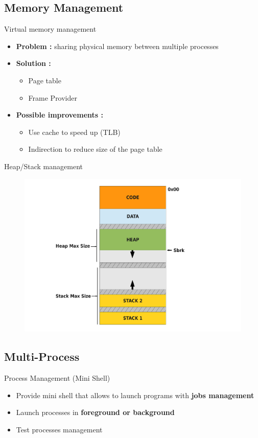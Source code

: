 \documentclass{beamer}
\begin{document}
\subsection{Memory Management}
\begin{frame}{Virtual memory management}
    \begin{itemize}
        \item \textbf{Problem :} sharing physical memory between multiple
            processes
        \item \textbf{Solution :}
            \begin{itemize}
                \item Page table
                \item Frame Provider
            \end{itemize}
        \item \textbf{Possible improvements :}
            \begin{itemize}
                \item Use cache to speed up (TLB)
                \item Indirection to reduce size of the page table
            \end{itemize}
    \end{itemize}
\end{frame}

\begin{frame}{Heap/Stack management}
    \begin{figure}[ht]
        \includegraphics[width=0.85\linewidth]{memoryschema.pdf}
    \end{figure}
\end{frame}

\subsection{Multi-Process}
\begin{frame}{Process Management (Mini Shell)}
  \begin{itemize}
      \item Provide mini shell that allows to launch
          programs with \textbf{jobs management}
      \item Launch processes in \textbf{foreground or background}
      \item Test processes management
  \end{itemize}
\end{frame}
\end{document}
